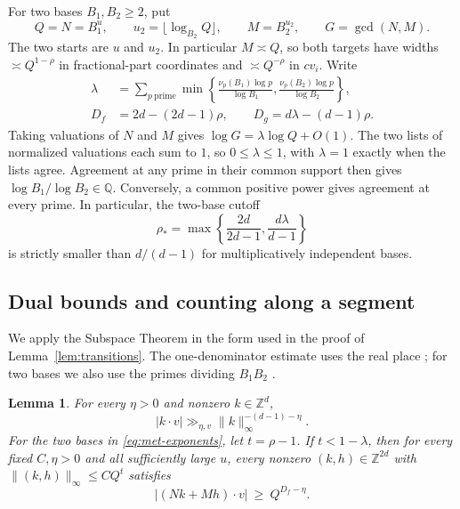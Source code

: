 \documentclass[11pt,reqno,a4paper]{amsart}
\newtheorem{lemma}[theorem]{Lemma}
\theoremstyle{remark}
\begin{document}
For two bases \(B_1,B_2\geq2\), put
\[
 Q=N=B_1^u,\qquad u_2=\lfloor\log_{B_2}Q\rfloor,\qquad M=B_2^{u_2},
 \qquad G=\gcd(N,M).
\]
The two starts are \(u\) and \(u_2\). In particular \(M\asymp Q\), so
both targets have widths \(\asymp Q^{1-\rho}\) in fractional-part
coordinates and \(\asymp Q^{-\rho}\) in \(cv_i\). Write
\begin{equation}\label{eq:met-exponents}
 \begin{split}
 \lambda
 &=\sum_{p\ \mathrm{prime}}\min\left\{
       \frac{\nu_p(B_1)\log p}{\log B_1},
       \frac{\nu_p(B_2)\log p}{\log B_2}
     \right\},\\
 D_f&=2d-(2d-1)\rho,\qquad
 D_g=d\lambda-(d-1)\rho.
 \end{split}
\end{equation}
Taking valuations of \(N\) and \(M\) gives
\(\log G=\lambda\log Q+O(1)\). The two lists of normalized valuations
each sum to \(1\), so \(0\leq\lambda\leq1\), with \(\lambda=1\) exactly
when the lists agree. Agreement at any prime in their common support
then gives \(\log B_1/\log B_2\in\mathbb Q\). Conversely, a common
positive power gives agreement at every prime. In particular, the
two-base cutoff
\[
 \rho_*=\max\left\{\frac{2d}{2d-1},\frac{d\lambda}{d-1}\right\}
\]
is strictly smaller than \(d/(d-1)\) for multiplicatively independent
bases. 
\subsection{Dual bounds and counting along a segment}

We apply the Subspace Theorem in the form used in the proof of
Lemma~\ref{lem:transitions}. The one-denominator estimate uses the
real place \cite{schmidt}; for two bases we also use the primes dividing
\(B_1B_2\) \cite{met-schlickewei}.

\begin{lemma}\label{lem:met-dual}
For every \(\eta>0\) and nonzero \(k\in\mathbb Z^d\),
\[
   |k\cdot v|\gg_{\eta,v}\|k\|_\infty^{-(d-1)-\eta}.
\]
For the two bases in \eqref{eq:met-exponents}, let \(t=\rho-1\).
If \(t<1-\lambda\), then for every fixed \(C,\eta>0\) and all
sufficiently large \(u\), every nonzero \((k,h)\in\mathbb Z^{2d}\)
with \(\|(k,h)\|_\infty\leq C Q^t\) satisfies
\begin{equation}\label{eq:met-two-dual}
  |(Nk+Mh)\cdot v|\ \geq\ Q^{D_f-\eta}.
\end{equation}
\end{lemma}
\end{document}
